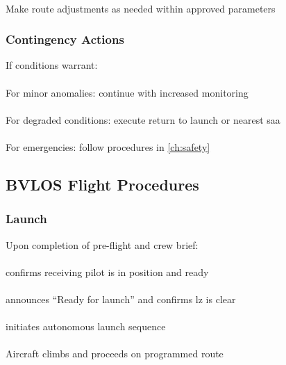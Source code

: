             \paragraph{} Make route adjustments as needed within approved parameters


        \subsubsection{Contingency Actions} If conditions warrant:
            \paragraph{} For minor anomalies: continue with increased monitoring
            \paragraph{} For degraded conditions: execute return to launch or nearest \ac{saa}
            \paragraph{} For emergencies: follow procedures in \cref{ch:safety}

    \subsection{BVLOS Flight Procedures}

        \subsubsection{Launch} Upon completion of pre-flight and crew brief:
            \paragraph{}  confirms receiving pilot is in position and ready
            \paragraph{}  announces ``Ready for launch'' and confirms \ac{lz} is clear
            \paragraph{}  initiates autonomous launch sequence
            \paragraph{} Aircraft climbs and proceeds on programmed route

